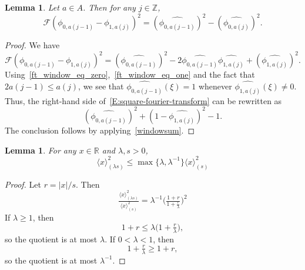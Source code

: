 \documentclass[12pt,reqno]{amsart}
\theoremstyle{plain}
\newtheorem{lemma}[theorem]{Lemma}
\numberwithin{equation}{section}
\theoremstyle{remark}
\newcommand{\Z}{{\mathbb Z}}
\newcommand{\R}{{\mathbb R}}
\begin{document}
\begin{lemma}\label{L:fourier-transform-window}
Let $a\in A$. Then for any $j\in \Z$,
\begin{equation}\label{auto:window-square-Fourier-identity}
\mathcal F({\phi}_{0,a(j-1)}-{\phi}_{1,a(j)})^2=
(\widehat{{\phi}_{0,a(j-1)}})^2-(\widehat{{\phi}_{0,a(j)}})^2.
\end{equation}
\end{lemma}

\begin{proof}
We have
\begin{equation}\label{E:square-fourier-transform}
\mathcal F({\phi}_{0,a(j-1)}-{\phi}_{1,a(j)})^2=
(\widehat{{\phi}_{0,a(j-1)}})^2 - 2 \widehat{{\phi}_{0,a(j-1)}} \widehat{{\phi}_{1,a(j)}} +(\widehat{{\phi}_{1,a(j)}})^2.
\end{equation}
Using~\eqref{ft_window_eq_zero},~\eqref{ft_window_eq_one} and the fact that $2a(j-1) \leq a(j)$, we see that $\widehat{{\phi}_{0,a(j-1)}}(\xi)=1$ whenever $\widehat{{\phi}_{1,a(j)}}(\xi) \neq 0$. Thus, the right-hand side of~\eqref{E:square-fourier-transform} can be rewritten as
\[
(\widehat{{\phi}_{0,a(j-1)}})^2 +(1-\widehat{{\phi}_{1,a(j)}})^2-1.
\]
The conclusion follows by applying~\eqref{windowsum}.
\end{proof}

\begin{lemma} \label{lem:scaleest}
    For any $x\in \R$ and $\lambda, s>0$,
    \begin{equation}\label{auto:scaled-bracket-comparison}\langle x \rangle^2_{(\lambda s)} \le \max\{\lambda,\lambda^{-1}\}\langle x \rangle^2_{(s)}\end{equation}
\end{lemma}
\begin{proof}
    Let $r=|x|/s$. Then
    \[\tfrac{\langle x \rangle^2_{(\lambda s)} }{\langle x \rangle^2_{(s)}} = \lambda^{-1}\Big(\tfrac{1+r}{1+\tfrac{r}{\lambda}} \Big)^2\]
    If $\lambda\ge 1$, then
    \[1+r\le \lambda\Big(1+\tfrac{r}{\lambda} \Big),\]
    so the quotient is at most $\lambda$. If $0<\lambda <1$, then
    \[1+\tfrac{r}{\lambda}\ge 1+ r,\]
    so the quotient is at most $\lambda^{-1}$.
\end{proof}
\end{document}
